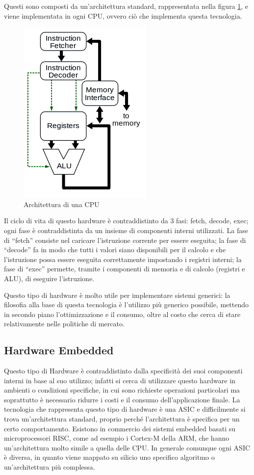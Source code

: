 \documentclass[11pt]{article} %
\begin{document}
Questi sono composti da un'architettura standard,  rappresentata nella figura  \ref{fig:0}, e viene implementata in ogni CPU, ovvero ciò che implementa questa tecnologia.

\begin{figure}
\centering
\includegraphics[scale=1]{cpu.png}
\caption{Architettura di una CPU}\label{fig:0}
\end{figure}

Il ciclo di vita di questo hardware è contraddistinto da 3 fasi: fetch, decode, exec; ogni fase è contraddistinta da un insieme di componenti interni utilizzati. La fase di ``fetch'' consiste nel caricare l'istruzione corrente per essere eseguita; la fase di ``decode'' fa in modo che tutti i valori siano disponibili per il calcolo e che l'istruzione possa essere eseguita correttamente impostando i registri interni; la fase di ``exec'' permette, tramite i componenti di memoria e di calcolo (registri e ALU), di eseguire l'istruzione. 

Questo tipo di hardware è molto utile per implementare sistemi generici: la filosofia alla base di questa tecnologia è l'utilizzo più generico possibile, mettendo in secondo piano l'ottimizzazione e il consumo, oltre al costo che cerca di stare relativamente nelle politiche di mercato.

\subsection{Hardware Embedded}
Questo tipo di Hardware è contraddistinto dalla specificità dei suoi componenti interni in base al suo utilizzo; infatti si cerca di utilizzare questo hardware in ambienti o condizioni specifiche, in cui sono richieste operazioni particolari ma soprattutto è necessario ridurre i costi e il consumo dell'applicazione finale.
La tecnologia che rappresenta questo tipo di hardware è una ASIC e difficilmente si trova un'architettura standard, proprio perché l'architettura è specifica per un certo comportamento. Esistono in commercio dei sistemi embedded basati su microprocessori RISC, come ad esempio i Cortex-M della ARM, che hanno un'architettura molto simile a quella delle CPU. In generale comunque ogni ASIC è diversa, in quanto viene mappato su silicio uno specifico algoritmo o un'architettura più complessa.
\end{document}
